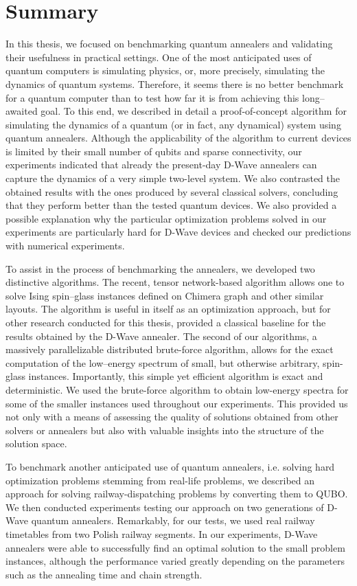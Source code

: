 \chapter*{Summary}

In this thesis, we focused on benchmarking quantum annealers and validating their
usefulness in practical settings. One of the most anticipated uses of quantum computers
is simulating physics, or, more precisely, simulating the dynamics of quantum systems.
Therefore, it seems there is no better benchmark for a quantum computer than to test
how far it is from achieving this long--awaited goal. To this end, we described in detail a
proof-of-concept algorithm for simulating the dynamics of a quantum (or in fact, any
dynamical) system using quantum annealers. Although the applicability of the algorithm
to current devices is limited by their small number of qubits and sparse connectivity,
our experiments indicated that already the present-day D-Wave annealers can capture
the dynamics of a very simple two-level system. We also contrasted the obtained results
with the ones produced by several classical solvers, concluding that they perform better
than the tested quantum devices. We also provided a possible explanation why the
particular optimization problems solved in our experiments are particularly hard for
D-Wave devices and checked our predictions with numerical experiments.

To assist in the process of benchmarking the annealers, we developed two distinctive
algorithms. The recent, tensor network-based algorithm allows one to solve Ising
spin--glass instances defined on Chimera graph and other similar layouts. The algorithm
is useful in itself as an optimization approach, but for other research conducted for
this thesis, provided a classical baseline for the results obtained by the D-Wave
annealer. The second of our algorithms, a massively parallelizable distributed brute-force
algorithm, allows for the exact computation of the low--energy spectrum of small,
but otherwise arbitrary, spin-glass instances. Importantly, this simple yet
efficient algorithm is exact and deterministic. We used the brute-force algorithm
to obtain low-energy spectra for some of the smaller instances used throughout
our experiments. This provided us not only with a means of assessing the quality of
solutions obtained from other solvers or annealers but also with valuable
insights into the structure of the solution space.

To benchmark another anticipated use of quantum annealers, i.e. solving hard
optimization problems stemming from real-life problems, we described an approach
for solving railway-dispatching problems by converting them to QUBO. We then
conducted experiments testing our approach on two generations of D-Wave quantum
annealers. Remarkably, for our tests, we used real railway timetables from two Polish
railway segments. In our experiments, D-Wave annealers were able to successfully
find an optimal solution to the small problem instances, although the performance
varied greatly depending on the parameters such as the annealing time and chain strength.

